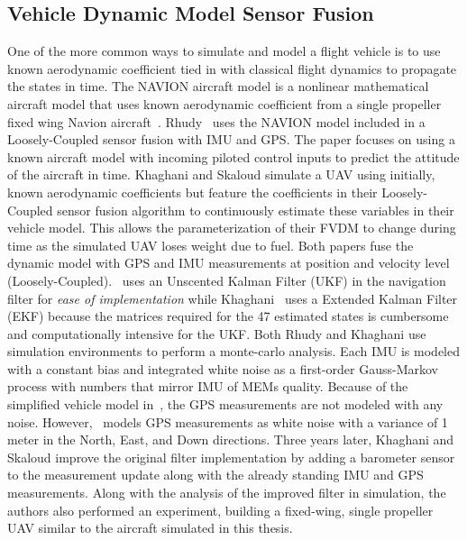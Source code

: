 \subsection{Vehicle Dynamic Model Sensor Fusion}
One of the more common ways to simulate and model a flight vehicle is to use known aerodynamic coefficient tied in with classical flight dynamics to propagate the states in time. The NAVION aircraft model is a nonlinear mathematical aircraft model that uses known aerodynamic coefficient from a single propeller fixed wing Navion aircraft~\cite{nelsonFlightStabilityAutomatic1998}. Rhudy~\cite{rhudyDynamicModelaidedSensor2017} uses the NAVION model included in a Loosely-Coupled sensor fusion with IMU and GPS\@. The paper focuses on using a known aircraft model with incoming piloted control inputs to predict the attitude of the aircraft in time. Khaghani and Skaloud simulate a UAV using initially, known aerodynamic coefficients but feature the coefficients in their Loosely-Coupled sensor fusion algorithm to continuously estimate these variables in their vehicle model. This allows the parameterization of their FVDM to change during time as the simulated UAV loses weight due to fuel. Both papers fuse the dynamic model with GPS and IMU measurements at position and velocity level (Loosely-Coupled).~\cite{rhudyDynamicModelaidedSensor2017} uses an Unscented Kalman Filter (UKF) in the navigation filter for \textit{ease of implementation} while Khaghani~\cite{khaghaniAutonomousVehicleDynamic2016,khaghaniAssessmentVDMbasedAutonomous2018} uses a Extended Kalman Filter (EKF) because the matrices required for the 47 estimated states is cumbersome and computationally intensive for the UKF\@. Both Rhudy and Khaghani use simulation environments to perform a monte-carlo analysis. Each IMU is modeled with a constant bias and integrated white noise as a first-order Gauss-Markov process with numbers that mirror IMU of MEMs quality. Because of the simplified vehicle model in~\cite{rhudyDynamicModelaidedSensor2017}, the GPS measurements are not modeled with any noise. However,~\cite{khaghaniAutonomousVehicleDynamic2016} models GPS measurements as white noise with a variance of 1 meter in the North, East, and Down directions. Three years later, Khaghani and Skaloud improve the original filter implementation by adding a barometer sensor to the measurement update along with the already standing IMU and GPS measurements. Along with the analysis of the improved filter in simulation, the authors also performed an experiment, building a fixed-wing, single propeller UAV similar to the aircraft simulated in this thesis.

